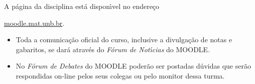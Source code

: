 \documentclass[12pt]{article}
\begin{document}
\vspace{0.5cm}
 A p\'agina da disciplina est\'a dispon{\'\i}vel no endere\c{c}o
\begin{center}
    \url{moodle.mat.unb.br}.
\end{center}


\begin{itemize}
\item Toda a comunica\c{c}\~ao oficial do curso, inclusive a divulga\c{c}\~ao de
notas e gabaritos, se dar\'a atrav\'es do {\em F\'orum de Not{\'\i}cias} do
MOODLE.\vspace{-0.20cm}
\item No {\em F\'orum de Debates} do MOODLE poder\~ao ser
postadas d\'uvidas que ser\~ao respondidas on-line pelos seus
colegas ou pelo monitor dessa turma.
\end{itemize}

\end{document}
